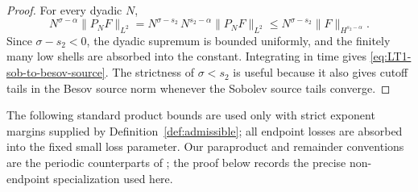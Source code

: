 \documentclass[10pt]{amsart}
\numberwithin{equation}{section}
\theoremstyle{plain}
\theoremstyle{definition}
\theoremstyle{remark}
\begin{document}
\begin{proof}
For every dyadic $N$,
\[
        N^{\sigma-\alpha}\|P_NF\|_{L^2}
        =N^{\sigma-s_2}\,N^{s_2-\alpha}\|P_NF\|_{L^2}
        \le N^{\sigma-s_2}\|F\|_{H^{s_2-\alpha}}.
\]
Since $\sigma-s_2<0$, the dyadic supremum is bounded uniformly, and the finitely many low shells are absorbed into the constant.  Integrating in time gives \eqref{eq:LT1-sob-to-besov-source}.  The strictness of $\sigma<s_2$ is useful because it also gives cutoff tails in the Besov source norm whenever the Sobolev source tails converge.
\end{proof}

The following standard product bounds are used only with strict exponent margins supplied by Definition~\ref{def:admissible}; all endpoint losses are absorbed into the fixed small loss parameter.  Our paraproduct and remainder conventions are the periodic counterparts of \cite[Theorems~2.82 and~2.85]{BCD}; the proof below records the precise non-endpoint specialization used here.
\end{document}
